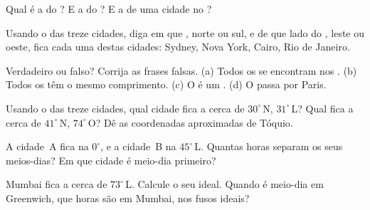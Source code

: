 \begin{exercise}[$\star$]\label{exo:g6:latitude-longitude:2}
Qual é a  do ? E a do ? E a de uma cidade no
?
\end{exercise}

\begin{exercise}[$\star$]\label{exo:g6:latitude-longitude:3}
Usando o  das treze cidades, diga em que , norte ou sul, e
de que lado do , leste ou oeste, fica cada uma destas
cidades: Sydney, Nova York, Cairo, Rio de Janeiro.
\end{exercise}

\begin{exercise}[$\star$]\label{exo:g6:latitude-longitude:4}
Verdadeiro ou falso? Corrija as frases falsas.
(a) Todos os  se encontram nos .
(b) Todos os  têm o mesmo comprimento.
(c) O  é um .
(d) O  passa por Paris.
\end{exercise}

\begin{exercise}[$\star\star$]\label{exo:g6:latitude-longitude:5}
Usando o  das treze cidades, qual cidade fica a cerca de
$30^\circ$\,N, $31^\circ$\,L? Qual fica a cerca de $41^\circ$\,N,
$74^\circ$\,O? Dê as coordenadas aproximadas de Tóquio.
\end{exercise}

\begin{exercise}[$\star\star$]\label{exo:g6:latitude-longitude:6}
A cidade~A fica na  $0^\circ$, e a cidade~B na 
$45^\circ$\,L. Quantas horas separam os seus meios-dias? Em que cidade é
meio-dia primeiro?
\end{exercise}

\begin{exercise}[$\star\star$]\label{exo:g6:latitude-longitude:7}
Mumbai fica a cerca de $73^\circ$\,L. Calcule o seu  ideal.
Quando é meio-dia em Greenwich, que horas são em Mumbai, nos fusos ideais?
\end{exercise}

